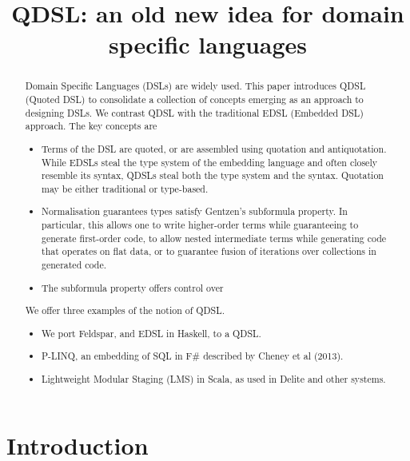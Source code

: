 \title{QDSL: an old new idea for domain specific languages}

\begin{abstract}
Domain Specific Languages (DSLs) are widely used.
This paper introduces QDSL (Quoted DSL) 
to consolidate a collection of concepts emerging as an approach
to designing DSLs.
We contrast QDSL with the traditional EDSL (Embedded DSL) approach.
The key concepts are
\begin{itemize}
\item Terms of the DSL are quoted, or are assembled using quotation
      and antiquotation. While EDSLs steal the type system of the
      embedding language and often closely resemble its syntax,
      QDSLs steal both the type system and the syntax.
      Quotation may be either traditional or type-based.
\item Normalisation guarantees types satisfy Gentzen's subformula property.
      In particular, this allows one to write higher-order terms while
      guaranteeing to generate first-order code, to allow nested intermediate
      terms while generating code that operates on flat data, or to guarantee
      fusion of iterations over collections in generated code.
\item The subformula property offers control over
\end{itemize}
We offer three examples of the notion of QDSL.
\begin{itemize}
\item We port Feldspar, and EDSL in Haskell, to a QDSL.
\item P-LINQ, an embedding of SQL in F# described by Cheney et al (2013).
\item Lightweight Modular Staging (LMS) in Scala, as used in Delite and other systems.
\end{itemize}
\end{abstract}

\section{Introduction}

